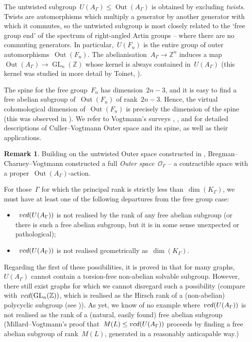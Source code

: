 \documentclass[11pt]{amsart}
\theoremstyle{definition}
\theoremstyle{definition}
\theoremstyle{definition}
\theoremstyle{definition}
\newtheorem{remark}[theorem]{Remark}
\newcommand{\raag}{A_\Gamma} %
\newcommand{\uag}{U(A_{\Gamma})} %
\newcommand{\oag}{\operatorname{Out}(A_{\Gamma})} %
\newcommand{\vcduag}{\textsc{vcd}(U(A_{\Gamma}))} %
\newcommand{\spine}{K_{\Gamma}} %
\newcommand{\os}{\mathcal{O}_\Gamma} %
\begin{document}
The untwisted subgroup~$\uag \leq \oag$ is obtained by excluding \emph{twists}. Twists are automorphisms which multiply a generator by another generator with which it commutes, so the untwisted subgroup is most closely related to the `free group end' of the spectrum of right-angled Artin groups -- where there are no commuting generators. In particular,~$U(F_n)$ is the entire group of outer automorphisms~$\operatorname{Out}(F_n)$. The abelianisation~$\raag \to \mathbb{Z}^n$ induces a map~$\oag \to \operatorname{GL}_n(\mathbb{Z})$ whose kernel is always contained in~$\uag$ (this kernel was studied in more detail by Toinet,  \cite{ToinetConjugacySeparabilityRAAGs13}).

The spine for the free group~$F_n$ has dimension~$2n-3$, and it is easy to find a free abelian subgroup of~$\operatorname{Out}(F_n)$ of rank~$2n-3$. Hence, the virtual cohomological dimension of~$\operatorname{Out}(F_n)$ is precisely the dimension of the spine (this was observed in \cite{CullerVogtmannOuterSpace86}). We refer to Vogtmann's surveys \cite{VogtmannOuterSpaceSurvey02}, \cite{VogtmannOuterSpaceSurvey18}, and \cite{CroweHelmsVogtmannOuterSpaceSurvey25} for detailed descriptions of Culler--Vogtmann Outer space and its spine, as well as their applications. 

\begin{remark}\label{rem:dichotomy about failure of bounds to match}
    Building on the untwisted Outer space constructed in \cite{CharneyStambaughVogtmannUntwistedOuterSpace17}, Bregman--Charney--Vogtmann \cite{BregmanCharneyVogtmannOuterSpaceRAAGs23} constructed a full \emph{Outer space}~$\os$ -- a contractible space with a proper~$\oag$-action.
\end{remark}

For those~$\Gamma$ for which the principal rank is strictly less than~$\dim(\spine)$, we must have at least one of the following departures from the free group case:
\begin{itemize}
    \item~$\vcduag$ is not realised by the rank of any free abelian subgroup (or there is such a free abelian subgroup, but it is in some sense unexpected or pathological);
    \item~$\vcduag$ is not realised geometrically as~$\dim(\spine)$.
\end{itemize}

Regarding the first of these possibilities, it is proved in \cite{CharneyVogtmannSubgpsQuotientsRAAGs11} that for many graphs,~$\uag$ cannot contain a torsion-free non-abelian solvable subgroup. However, there still exist graphs for which we cannot disregard such a possibility (compare with~$\textsc{vcd}(\operatorname{GL}_n(\mathbb{Z}))$, which is realised as the Hirsch rank of a (non-abelian) polycyclic subgroup (see \cite[Theorem 7.10 \& \S7.4]{BieriHomologicalDimensionDiscreteGroupsBook81})). As yet, we know of no example where~$\vcduag$ is not realised as the rank of a (natural, easily found) free abelian subgroup (Millard--Vogtmann's proof \cite{MillardVogtmannCubeComplexes21} that~$M(L) \leq \vcduag$ proceeds by finding a free abelian subgroup of rank~$M(L)$, generated in a reasonably anticapable way.) 
\end{document}
